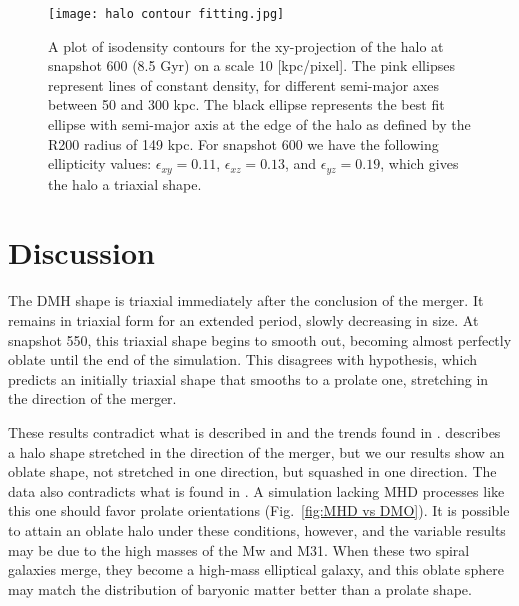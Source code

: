 \documentclass[fleqn,usenatbib]{mnras}
\begin{document}
\begin{figure}
	\texttt{[image: halo contour fitting.jpg]}
    \caption{A plot of isodensity contours for the xy-projection of the halo at snapshot 600 (8.5 Gyr) on a scale 10 [kpc/pixel]. The pink ellipses represent lines of constant density, for different semi-major axes between 50 and 300 kpc. The black ellipse represents the best fit ellipse with semi-major axis at the edge of the halo as defined by the R200 radius of 149 kpc. For snapshot 600 we have the following ellipticity values: \begin{math}\epsilon_{xy}=0.11\end{math}, \begin{math}\epsilon_{xz}=0.13\end{math}, and \begin{math}\epsilon_{yz}=0.19\end{math}, which gives the halo a triaxial shape.}            
    \label{fig:contour fitting}
\end{figure}


\section{Discussion}

The DMH shape is triaxial immediately after the conclusion of the merger. It remains in triaxial form for an extended period, slowly decreasing in size. At snapshot 550, this triaxial shape begins to smooth out, becoming almost perfectly oblate until the end of the simulation. This disagrees with hypothesis, which predicts an initially triaxial shape that smooths to a prolate one, stretching in the direction of the merger.

These results contradict what is described in \citet{Despali_2016} and the trends found in \citet{Prada_2019}. \citet{Despali_2016} describes a halo shape stretched in the direction of the merger, but we our results show an oblate shape, not stretched in one direction, but squashed in one direction. The data also contradicts what is found in \citet{Prada_2019}. A simulation lacking MHD processes like this one should favor prolate orientations (Fig.~\ref{fig:MHD vs DMO}). It is possible to attain an oblate halo under these conditions, however, and the variable results may be due to the high masses of the Mw and M31. When these two spiral galaxies merge, they become a high-mass elliptical galaxy, and this oblate sphere may match the distribution of baryonic matter better than a prolate shape.
\end{document}
